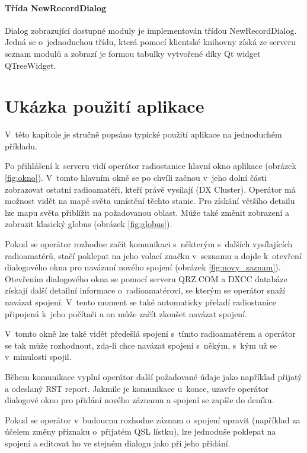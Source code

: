 \subsubsection{Třída NewRecordDialog}

Dialog zobrazující dostupné moduly je implementován třídou NewRecordDialog. Jedná se o~jednoduchou třídu, která pomocí
klientské knihovny získá ze serveru seznam modulů a zobrazí je formou tabulky vytvořené díky Qt widget QTreeWidget.

\chapter{Ukázka použití aplikace}

V~této kapitole je stručně popsáno typické použití aplikace na jednoduchém příkladu.

Po přihlášení k~serveru vidí operátor radiostanice hlavní okno aplikace (obrázek \ref{fig:okno}).
V~tomto hlavním okně se po chvíli začnou v~jeho dolní části zobrazovat ostatní radioamatéři, kteří
právě vysílají (DX Cluster). Operátor má možnost vidět na mapě světa umístění těchto stanic. Pro získání většího 
detailu lze mapu světa přiblížit na požadovanou oblast. Může také změnit zobrazení a zobrazit klasický
globus (obrázek \ref{fig:globus}).

Pokud se operátor rozhodne začít komunikaci s~některým s~dalších vysílajících radioamatérů, stačí
poklepat na jeho volací značku v~seznamu a dojde k~otevření dialogového okna pro navázaní nového spojení (obrázek \ref{fig:novy_zaznam}).
Otevřením dialogového okna se pomocí serveru QRZ.COM a DXCC databáze získají další detailní informace o~radioamatérovi, se kterým 
se operátor snaží navázat spojení. V~tento moment se také automaticky přeladí radiostanice připojená
k~jeho počítači a on může začít zkoušet navázat spojení.

V~tomto okně lze také vidět předešlá spojení s~tímto radioamatérem a operátor se tak může rozhodnout, zda-li chce
navázat spojení s~někým, s~kým už se v~minulosti spojil.

Během komunikace vyplní operátor další požadované údaje jako například přijatý a odeslaný RST report. Jakmile je komunikace
u~konce, uzavře operátor dialogové okno pro přidání nového záznamu a spojení se zapíše do deníku.

Pokud se operátor v~budoucnu rozhodne záznam o~spojení upravit (například za účelem změny příznaku
o~přijatém QSL lístku), lze jednoduše poklepat na spojení a editovat ho ve stejném dialogu jako při jeho
přidání.

